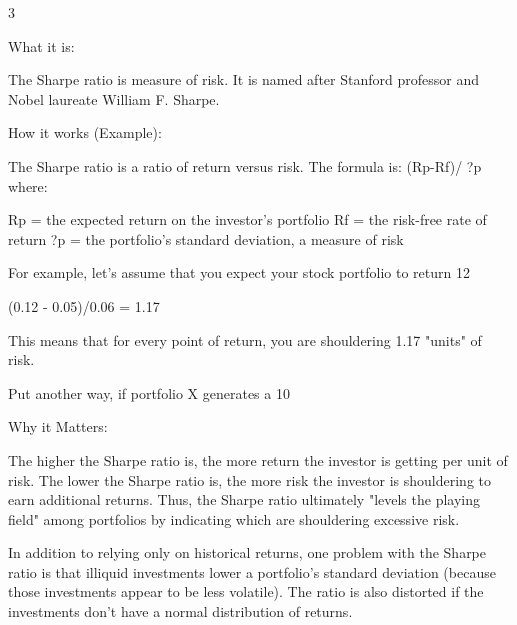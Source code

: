





3











What it is: 


The Sharpe ratio is measure of risk. It is named after Stanford professor and Nobel laureate William F. Sharpe.


How it works (Example): 


The Sharpe ratio is a ratio of return versus risk. The formula is:
(Rp-Rf)/ ?p
 where:

Rp = the expected return on the investor's portfolio
 Rf = the risk-free rate of return
 ?p = the portfolio's standard deviation, a measure of risk

For example, let's assume that you expect your stock portfolio to return 12%

(0.12 - 0.05)/0.06 = 1.17

This means that for every point of return, you are shouldering 1.17 "units" of risk.

Put another way, if portfolio X generates a 10%


Why it Matters: 


The higher the Sharpe ratio is, the more return the investor is getting per unit of risk. The lower the Sharpe ratio is, the more risk the investor is shouldering to earn additional returns. Thus, the Sharpe ratio ultimately "levels the playing field" among portfolios by indicating which are shouldering excessive risk.

In addition to relying only on historical returns, one problem with the Sharpe ratio is that illiquid investments lower a portfolio's standard deviation (because those investments appear to be less volatile). The ratio is also distorted if the investments don't have a normal distribution of returns.
